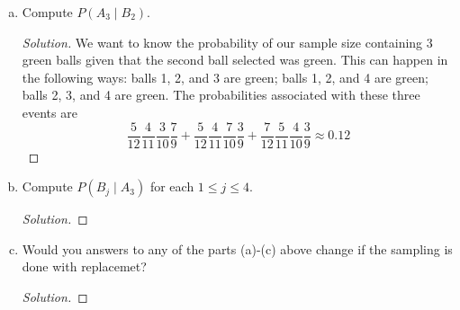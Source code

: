 \documentclass[12pt]{article}
\newenvironment{solution}
{\renewcommand\qedsymbol{$\blacksquare$}\begin{proof}[Solution]}
{\end{proof}}
\begin{document}
\begin{enumerate}
\begin{enumerate}[(a)]
\begin{solution}
\begin{align*}
                            +\frac{5}{10}\frac{6}{11}\frac{7}{12} 
                            \approx 0.42
                        \end{align*}
                    \end{solution}
                \item Compute $P(A_3\mid B_2)$.
                    \begin{solution}
                        We want to know the probability of our sample size
                        containing 3 green balls given that the second ball
                        selected was green. This can happen in the following
                        ways: balls 1, 2, and 3 are green; balls 1, 2, and
                        4 are green; balls 2, 3, and 4 are green. The
                        probabilities associated with these three events are
                        \begin{equation*}
                            \frac{5}{12}\frac{4}{11}\frac{3}{10}\frac{7}{9}
                            +\frac{5}{12}\frac{4}{11}\frac{7}{10}\frac{3}{9}
                            +\frac{7}{12}\frac{5}{11}\frac{4}{10}\frac{3}{9}
                            \approx 0.12
                        \end{equation*}
                    \end{solution}
                \item Compute $P(B_j\mid A_3)$ for each $1\leq j\leq 4$. 
                    \begin{solution}
                        
                    \end{solution}
                \item Would you answers to any of the parts (a)-(c) above
                    change if the sampling is done with replacemet?
                    \begin{solution}
                        
                    \end{solution}
            \end{enumerate} 
    \end{enumerate}
\end{document}
